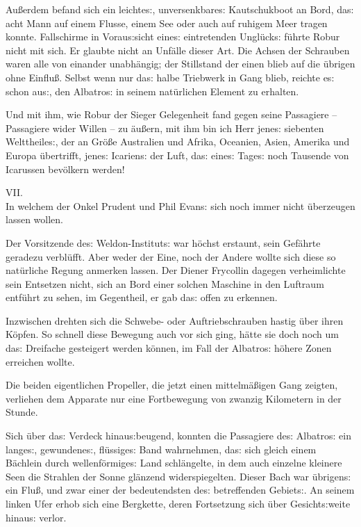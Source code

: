 \documentclass[oneside,12pt]{book}
\newenvironment{antiqua}{\normalfont}{}
\newcommand{\s}{s:}
\begin{document}
Au{\ss}erdem befand sich ein leichte{\s}, unversenkbare{\s}
Kautschukboot an Bord, da{\s} acht Mann auf einem Flusse, einem See
oder auch auf ruhigem Meer tragen konnte. Fallschirme in
Vorau{\s}sicht eine{\s} eintretenden Ungl\"uck{\s} f\"uhrte Robur
nicht mit sich. Er glaubte nicht an Unf\"alle dieser Art. Die Achsen
der Schrauben waren alle von einander unabh\"angig; der Stillstand
der einen blieb auf die \"ubrigen ohne Einflu{\ss}. Selbst wenn nur
da{\s} halbe Triebwerk in Gang blieb, reichte e{\s} schon au{\s}, den
{\glqq}Albatro{\s}{\grqq} in seinem nat\"urlichen Element zu
erhalten.

{\glqq}Und mit ihm, wie Robur der Sieger Gelegenheit fand gegen seine
Passagiere -- Passagiere wider Willen -- zu \"au{\ss}ern, mit ihm bin
ich Herr jene{\s} siebenten Welttheile{\s}, der an Gr\"o{\ss}e
Australien und Afrika, Oceanien, Asien, Amerika und Europa
\"ubertrifft, jene{\s} Icarien{\s} der Luft, da{\s} eine{\s} Tage{\s}
noch Tausende von Icarussen bev\"olkern werden!{\grqq}



\newpage\begin{center}\label{kap07}
{\large \begin{antiqua}VII.\end{antiqua}\\
In welchem der Onkel Prudent und Phil Evan{\s} sich noch immer nicht
\"uberzeugen lassen wollen.\\\bigskip}
\end{center}



Der Vorsitzende de{\s} Weldon-Institut{\s} war h\"ochst erstaunt,
sein Gef\"ahrte geradezu verbl\"ufft. Aber weder der Eine, noch der
Andere wollte sich diese so nat\"urliche Regung anmerken lassen. Der
Diener Frycollin dagegen verheimlichte sein Entsetzen nicht, sich an
Bord einer solchen Maschine in den Luftraum entf\"uhrt zu sehen, im
Gegentheil, er gab da{\s} offen zu erkennen.

Inzwischen drehten sich die Schwebe- oder Auftriebschrauben hastig
\"uber ihren K\"opfen. So schnell diese Bewegung auch vor sich ging,
h\"atte sie doch noch um da{\s} Dreifache gesteigert werden k\"onnen,
im Fall der {\glqq}Albatro{\s}{\grqq} h\"ohere Zonen erreichen
wollte.

Die beiden eigentlichen Propeller, die jetzt einen mittelm\"a{\ss}igen
Gang zeigten, verliehen dem Apparate nur eine Fortbewegung von
zwanzig Kilometern in der Stunde.

Sich \"uber da{\s} Verdeck hinau{\s}beugend, konnten die Passagiere
de{\s} {\glqq}Albatro{\s}{\grqq} ein lange{\s}, gewundene{\s},
fl\"ussige{\s} Band wahrnehmen, da{\s} sich gleich einem B\"achlein
durch wellenf\"ormige{\s} Land schl\"angelte, in dem auch einzelne
kleinere Seen die Strahlen der Sonne gl\"anzend widerspiegelten.
Dieser Bach war \"ubrigen{\s} ein Flu{\ss}, und zwar einer der
bedeutendsten de{\s} betreffenden Gebiet{\s}. An seinem linken Ufer
erhob sich eine Bergkette, deren Fortsetzung sich \"uber
Gesicht{\s}weite hinau{\s} verlor.
\end{document}
